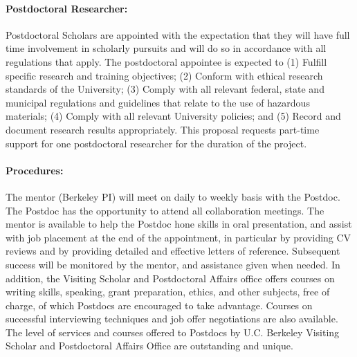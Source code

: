 \documentclass{proposalnsf}
\newlength{\up}
\begin{document}
\paragraph{Postdoctoral Researcher:} Postdoctoral Scholars are appointed with the expectation that they will have full time involvement in scholarly pursuits and will do so in accordance with all regulations that apply. The postdoctoral appointee is expected to (1) Fulfill specific research and training objectives; (2) Conform with ethical research standards of the University; (3) Comply with all relevant federal, state and municipal regulations and guidelines that relate to the use of hazardous materials; (4) Comply with all relevant University policies; and (5) Record and document research results appropriately. This proposal requests part-time support for one postdoctoral researcher for the duration of the project.  

\paragraph{Procedures:} The mentor (Berkeley PI) will meet on daily to weekly basis with the Postdoc. The Postdoc has the opportunity to attend all collaboration meetings.
The mentor is available to help the Postdoc hone skills in oral presentation, and assist with job placement at the end of the appointment, in particular by providing CV reviews and by providing detailed and effective letters of reference. Subsequent success will be monitored by the mentor, and assistance given when needed.
In addition, the Visiting Scholar and Postdoctoral Affairs office offers courses on writing skills, speaking, grant preparation, ethics, and other subjects, free of charge, of which Postdocs are encouraged to take advantage. Courses on successful interviewing techniques and job offer negotiations are also available. The level of services and courses offered to Postdocs by U.C. Berkeley Visiting Scholar and Postdoctoral Affairs Office are outstanding and unique.
\end{document}
